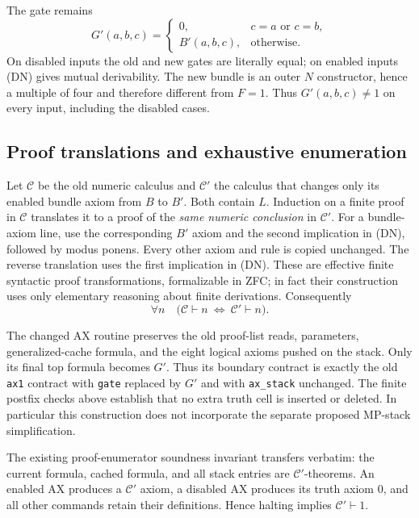 The gate remains
\[
 G'(a,b,c)=
 \begin{cases}
  0,&c=a\text{ or }c=b,\\
  B'(a,b,c),&\text{otherwise}.
 \end{cases}
\]
On disabled inputs the old and new gates are literally equal; on
enabled inputs (DN) gives mutual derivability.  The new bundle is
an outer $N$ constructor, hence a multiple of four and therefore
different from $F=1$.  Thus $G'(a,b,c)\ne1$ on every input, including
the disabled cases.

\subsection{Proof translations and exhaustive enumeration}

Let $\mathcal C$ be the old numeric calculus and $\mathcal C'$ the
calculus that changes only its enabled bundle axiom from $B$ to $B'$.
Both contain $L$.  Induction on a finite proof in $\mathcal C$
translates it to a proof of the \emph{same numeric conclusion} in
$\mathcal C'$.  For a bundle-axiom line, use the corresponding $B'$
axiom and the second implication in (DN), followed by modus ponens.
Every other axiom and rule is copied unchanged.  The reverse
translation uses the first implication in (DN).  These are effective
finite syntactic proof transformations, formalizable in ZFC; in fact
their construction uses only elementary reasoning about finite
derivations.  Consequently
\[
 \forall n\quad
 \bigl(\mathcal C\vdash n\ \Longleftrightarrow\
       \mathcal C'\vdash n\bigr).             \tag{PT}
\]

The changed AX routine preserves the old proof-list reads, parameters,
generalized-cache formula, and the eight logical axioms pushed on the
stack.  Only its final top formula becomes $G'$.  Thus its boundary
contract is exactly the old \texttt{ax1} contract with \texttt{gate}
replaced by $G'$ and with \texttt{ax\_stack} unchanged.  The finite
postfix checks above establish that no extra truth cell is inserted
or deleted.  In particular this construction does not incorporate
the separate proposed MP-stack simplification.

The existing proof-enumerator soundness invariant transfers verbatim:
the current formula, cached formula, and all stack entries are
$\mathcal C'$-theorems.  An enabled AX produces a $\mathcal C'$ axiom,
a disabled AX produces its truth axiom $0$, and all other commands
retain their definitions.  Hence halting implies
$\mathcal C'\vdash1$.

